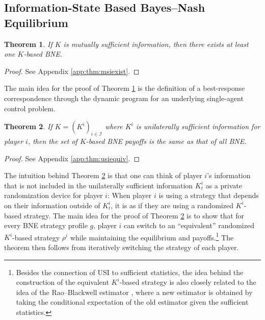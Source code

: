\documentclass[pdflatex,sn-basic]{sn-jnl}
\newcommand{\Comp}{K}
\theoremstyle{thmstyleone}%
\newtheorem{thm}{Theorem}
\theoremstyle{thmstyletwo}%
\theoremstyle{thmstylethree}%
\begin{document}
\subsection{Information-State Based Bayes--Nash Equilibrium}
\begin{thm}\label{thm:msiexist}
	If $\Comp$ is mutually sufficient information, then there exists at least one $\Comp$-based BNE.
\end{thm}
\begin{proof}
    See Appendix \ref{app:thm:msiexist}.
\end{proof}

The main idea for the proof of Theorem \ref{thm:msiexist} is {the definition of} a best-response correspondence through the dynamic program for an underlying single-agent control problem.

\begin{thm}\label{thm:usiequiv}
	If $\Comp=(\Comp^i)_{i\in\mathcal{I}}$ where $\Comp^i$ is unilaterally sufficient information for player $i$, then the set of $\Comp$-based BNE payoffs is the same as that of all BNE.
\end{thm}
\begin{proof}
    See Appendix \ref{app:thm:usiequiv}.
\end{proof}

The intuition behind Theorem \ref{thm:usiequiv} is that one can think of player $i$'s information {that is not included in} the unilaterally sufficient information $\Comp_t^i$ as a private randomization device for player $i$: When player $i$ is using a strategy that depends on their information outside of $\Comp_t^i$, it is as if they are using a randomized $\Comp^i$-based strategy. The main idea for the proof of Theorem \ref{thm:usiequiv} is to show that for every BNE strategy profile $g$, player $i$ can switch to an ``equivalent'' randomized $\Comp^i$-based strategy $\rho^i$ while maintaining the equilibrium and payoffs.\footnote{Besides the connection of USI to sufficient statistics, the idea behind the construction of the equivalent $\Comp^i$-based strategy is also closely related to the idea of the Rao--Blackwell estimator \citep{kay1993fundamentals}, where a new estimator is obtained by taking the conditional expectation of the old estimator given the sufficient statistics.} The theorem then follows from iteratively switching the strategy of each player.
\end{document}
